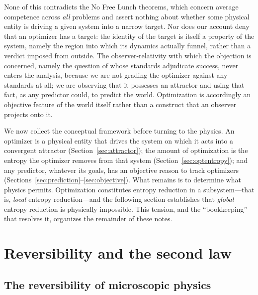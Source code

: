 \documentclass[10pt]{article}
\theoremstyle{definition}
\theoremstyle{remark}
\begin{document}
None of this contradicts the No Free Lunch theorems, which concern average competence across \emph{all} problems and assert nothing about whether some physical entity is driving a given system into a narrow target. Nor does our account deny that an optimizer has a target: the identity of the target is itself a property of the system, namely the region into which its dynamics actually funnel, rather than a verdict imposed from outside. The observer-relativity with which the objection is concerned, namely the question of whose standards adjudicate success, never enters the analysis, because we are not grading the optimizer against any standards at all; we are observing that it possesses an attractor and using that fact, as any predictor could, to predict the world. Optimization is accordingly an objective feature of the world itself rather than a construct that an observer projects onto it.

We now collect the conceptual framework before turning to the physics. An optimizer is a physical entity that drives the system on which it acts into a convergent attractor (Section~\ref{sec:attractor}); the amount of optimization is the entropy the optimizer removes from that system (Section~\ref{sec:optentropy}); and any predictor, whatever its goals, has an objective reason to track optimizers (Sections~\ref{sec:prediction}--\ref{sec:objective}). What remains is to determine what physics permits. Optimization constitutes entropy reduction in a subsystem---that is, \emph{local} entropy reduction---and the following section establishes that \emph{global} entropy reduction is physically impossible. This tension, and the ``bookkeeping'' that resolves it, organizes the remainder of these notes.
\section{Reversibility and the second law}
\label{sec:secondlaw}

\subsection{The reversibility of microscopic physics}
\label{sec:reversible}
\end{document}
